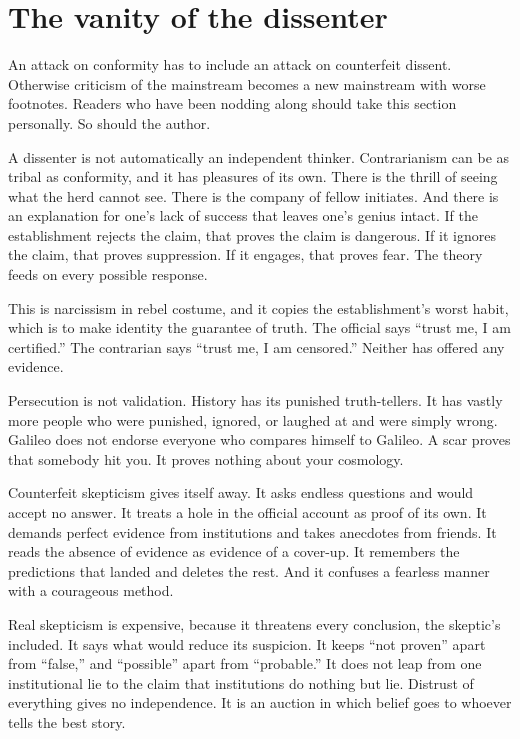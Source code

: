 \documentclass[12pt,a4paper]{book}
\begin{document}
\section{The vanity of the dissenter}

An attack on conformity has to include an attack on counterfeit dissent. Otherwise criticism of the mainstream becomes a new mainstream with worse footnotes. Readers who have been nodding along should take this section personally. So should the author.

A dissenter is not automatically an independent thinker. Contrarianism can be as tribal as conformity, and it has pleasures of its own. There is the thrill of seeing what the herd cannot see. There is the company of fellow initiates. And there is an explanation for one's lack of success that leaves one's genius intact. If the establishment rejects the claim, that proves the claim is dangerous. If it ignores the claim, that proves suppression. If it engages, that proves fear. The theory feeds on every possible response.

This is narcissism in rebel costume, and it copies the establishment's worst habit, which is to make identity the guarantee of truth. The official says ``trust me, I am certified.'' The contrarian says ``trust me, I am censored.'' Neither has offered any evidence.

Persecution is not validation. History has its punished truth-tellers. It has vastly more people who were punished, ignored, or laughed at and were simply wrong. Galileo does not endorse everyone who compares himself to Galileo. A scar proves that somebody hit you. It proves nothing about your cosmology.

Counterfeit skepticism gives itself away. It asks endless questions and would accept no answer. It treats a hole in the official account as proof of its own. It demands perfect evidence from institutions and takes anecdotes from friends. It reads the absence of evidence as evidence of a cover-up. It remembers the predictions that landed and deletes the rest. And it confuses a fearless manner with a courageous method.

Real skepticism is expensive, because it threatens every conclusion, the skeptic's included. It says what would reduce its suspicion. It keeps ``not proven'' apart from ``false,'' and ``possible'' apart from ``probable.'' It does not leap from one institutional lie to the claim that institutions do nothing but lie. Distrust of everything gives no independence. It is an auction in which belief goes to whoever tells the best story.
\end{document}
